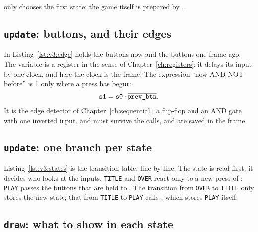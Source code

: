 
 only chooses the first state; the game itself is prepared by
.

\subsection{\texttt{update}: buttons, and their edges}


In Listing~\ref{lst:v3:edge}  holds the buttons now and
 the buttons one frame ago. The variable  is
a register in the sense of Chapter~\ref{ch:registers}: it delays its input by
one clock, and here the clock is the frame. The expression ``now AND NOT
before'' is 1 only where a press has begun:
\[ \texttt{s1}=\texttt{s0}\cdot\overline{\texttt{prev\_btn}} . \]
It is the edge detector of Chapter~\ref{ch:sequential}: a flip-flop and an AND
gate with one inverted input.  and  must survive the calls,
and are saved in the frame.

\subsection{\texttt{update}: one branch per state}


Listing~\ref{lst:v3:states} is the transition table, line by line. The state
is read first: it decides who looks at the inputs. \texttt{TITLE} and
\texttt{OVER} react only to a new press of ; \texttt{PLAY} passes the
buttons that are held to . The transition from
\texttt{OVER} to \texttt{TITLE} only stores the new state; that from
\texttt{TITLE} to \texttt{PLAY} calls , which stores
\texttt{PLAY} itself.

\subsection{\texttt{draw}: what to show in each state}


